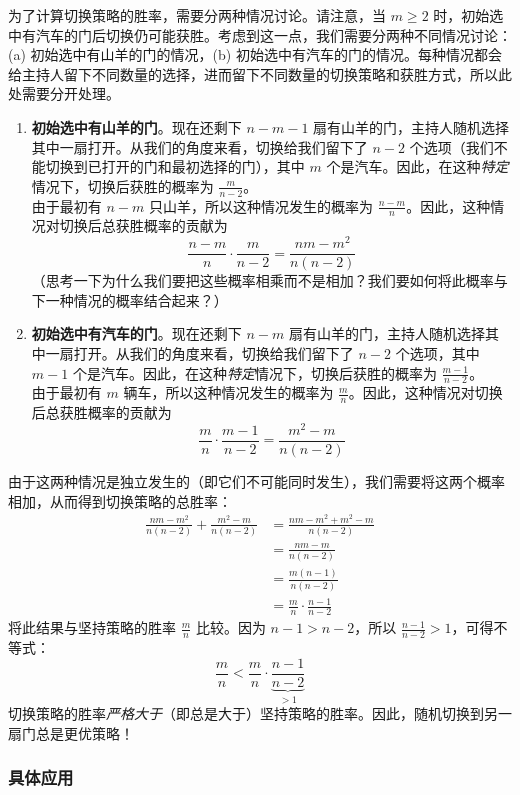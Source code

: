 为了计算切换策略的胜率，需要分两种情况讨论。请注意，当 $m \geq 2$ 时，初始选中有汽车的门后切换仍可能获胜。考虑到这一点，我们需要分两种不同情况讨论：(a) 初始选中有山羊的门的情况，(b) 初始选中有汽车的门的情况。每种情况都会给主持人留下不同数量的选择，进而留下不同数量的切换策略和获胜方式，所以此处需要分开处理。

\begin{enumerate}[label=(\alph*)]
    \item \textbf{初始选中有山羊的门}。现在还剩下 $n - m - 1$ 扇有山羊的门，主持人随机选择其中一扇打开。从我们的角度来看，切换给我们留下了 $n-2$ 个选项（我们不能切换到已打开的门和最初选择的门），其中 $m$ 个是汽车。因此，在这种\emph{特定}情况下，切换后获胜的概率为 $\frac{m}{n-2}$。\\
    由于最初有 $n - m$ 只山羊，所以这种情况发生的概率为 $\frac{n-m}{n}$。因此，这种情况对切换后总获胜概率的贡献为
    \[\frac{n-m}{n} \cdot \frac{m}{n-2} = \frac{nm-m^2}{n(n-2)}\]
    （思考一下为什么我们要把这些概率相乘而不是相加？我们要如何将此概率与下一种情况的概率结合起来？）
    \item \textbf{初始选中有汽车的门}。现在还剩下 $n - m$ 扇有山羊的门，主持人随机选择其中一扇打开。从我们的角度来看，切换给我们留下了 $n-2$ 个选项，其中 $m - 1$ 个是汽车。因此，在这种\emph{特定}情况下，切换后获胜的概率为 $\frac{m-1}{n-2}$。\\
    由于最初有 $m$ 辆车，所以这种情况发生的概率为 $\frac{m}{n}$。因此，这种情况对切换后总获胜概率的贡献为
    \[\frac{m}{n} \cdot \frac{m-1}{n-2} = \frac{m^2-m}{n(n-2)}\]
\end{enumerate}

由于这两种情况是独立发生的（即它们不可能同时发生），我们需要将这两个概率相加，从而得到切换策略的总胜率：
\begin{align*}
    \frac{nm-m^2}{n(n-2)} + \frac{m^2-m}{n(n-2)} &= \frac{nm - m^2 + m^2 - m}{n(n-2)} \\
    &= \frac{nm - m}{n(n-2)} \\
    &= \frac{m(n - 1)}{n(n-2)} \\
    &= \frac{m}{n} \cdot \frac{n-1}{n-2}
\end{align*}
将此结果与坚持策略的胜率 $\frac{m}{n}$ 比较。因为 $ n - 1 > n - 2$，所以 $\frac{n-1}{n-2} > 1$，可得不等式：
\[\frac{m}{n} < \frac{m}{n} \cdot \underbrace{\frac{n-1}{n-2}}_{>1}\]
切换策略的胜率\emph{严格大于}（即总是大于）坚持策略的胜率。因此，随机切换到另一扇门总是更优策略！

\subsubsection*{具体应用}

